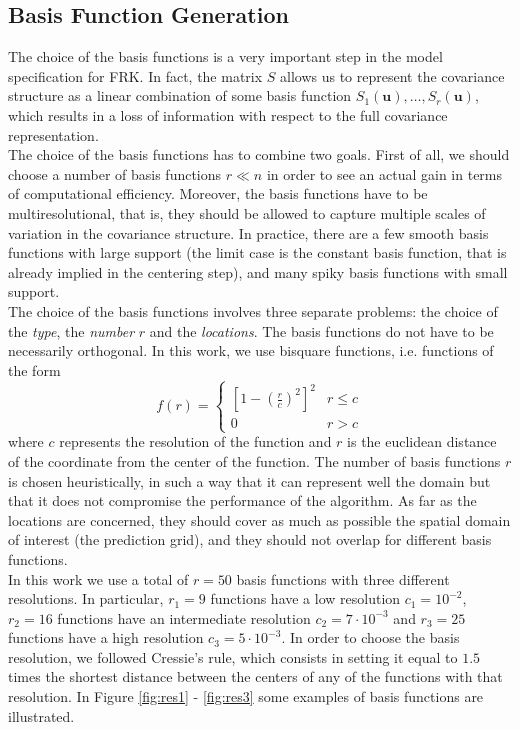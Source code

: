 \documentclass[11pt]{article}
\begin{document}
\newpage
\subsection{Basis Function Generation}

The choice of the basis functions is a very important step in the model specification for FRK. In fact, the matrix $S$ allows us to represent the covariance structure as a linear combination of some basis function $S_1(\bm{u}), \dots, S_r(\bm{u})$, which results in a loss of information with respect to the full covariance representation. \\

The choice of the basis functions has to combine two goals. First of all, we should choose a number of basis functions $r \ll n$ in order to see an actual gain in terms of computational efficiency. Moreover, the basis functions have to be multiresolutional, that is, they should be allowed to capture multiple scales of variation in the covariance structure. In practice, there are a few smooth basis functions with large support (the limit case is the constant basis function, that is already implied in the centering step), and many spiky basis functions with small support. \\

The choice of the basis functions involves three separate problems: the choice of the \textit{type}, the \textit{number} $r$ and the \textit{locations}. The basis functions do not have to be necessarily orthogonal. In this work, we use bisquare functions, i.e. functions of the form
\begin{equation*}
f(r) = \begin{cases}
\left[ 1 - \left( \frac{r}{c} \right)^2 \right]^2 & r \leq c
\\
0 & r > c
\end{cases}
\end{equation*}
where $c$ represents the resolution of the function and $r$ is the euclidean distance of the coordinate from the center of the function. The number of basis functions $r$ is chosen heuristically, in such a way that it can represent well the domain but that it does not compromise the performance of the algorithm. As far as the locations are concerned, they should cover as much as possible the spatial domain of interest (the prediction grid), and they should not overlap for different basis functions.\\

In this work we use a total of $r = 50$ basis functions with three different resolutions. In particular, $r_1 = 9$ functions have a low resolution $c_1 = 10^{-2}$, $r_2 = 16$ functions have an intermediate resolution $c_2 = 7 \cdot 10^{-3}$ and $r_3 = 25$ functions have a high resolution $c_3 = 5 \cdot 10^{-3}$. In order to choose the basis resolution, we followed Cressie's rule, which consists in setting it equal to $1.5$ times the shortest distance between the centers of any of the functions with that resolution. In Figure \ref{fig:res1} - \ref{fig:res3} some examples of basis functions are illustrated.
\end{document}
